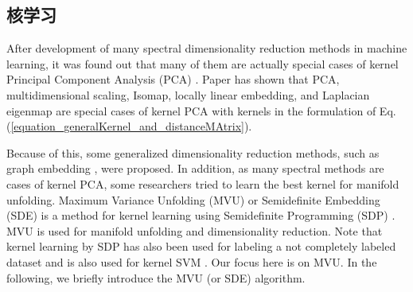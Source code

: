 \documentclass[lang=cn,10pt]{gorgeousnbook}
\numberwithin{equation}{section}%
\numberwithin{figure}{section}%
\begin{document}
\subsection{核学习}\label{section_kernel_learning}

After development of many spectral dimensionality reduction methods in machine learning, it was found out that many of them are actually special cases of kernel Principal Component Analysis (PCA) \cite{bengio2003spectral,bengio2004learning}. 
Paper \cite{ham2004kernel} has shown that PCA, multidimensional scaling, Isomap, locally linear embedding, and Laplacian eigenmap are special cases of kernel PCA with kernels in the formulation of Eq. (\ref{equation_generalKernel_and_distanceMAtrix}).

Because of this, some generalized dimensionality reduction methods, such as graph embedding \cite{yan2005graph}, were proposed.
In addition, as many spectral methods are cases of kernel PCA, some researchers tried to learn the best kernel for manifold unfolding. 
Maximum Variance Unfolding (MVU) or Semidefinite Embedding (SDE) \cite{weinberger2005nonlinear,weinberger2006unsupervised,weinberger2006introduction} is a method for kernel learning using Semidefinite Programming (SDP) \cite{vandenberghe1996semidefinite}. MVU is used for manifold unfolding and dimensionality reduction.
Note that kernel learning by SDP has also been used for labeling a not completely labeled dataset and is also used for kernel SVM \cite{lanckriet2004learning,karimi2017summary}. Our focus here is on MVU. 
In the following, we briefly introduce the MVU (or SDE) algorithm. 
\end{document}

